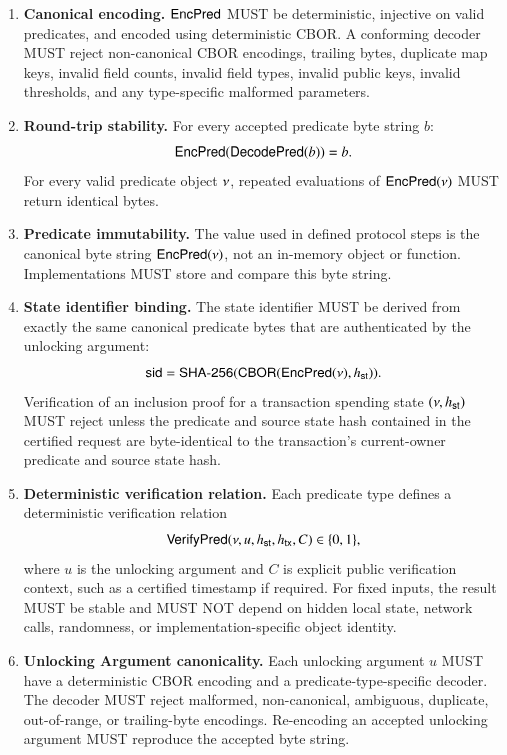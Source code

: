 \begin{enumerate}
  \item \textbf{Canonical encoding.}
    $\mathsf{EncPred}$ MUST be deterministic, injective on valid predicates, and encoded using deterministic CBOR. A conforming decoder MUST reject non-canonical CBOR encodings, trailing bytes, duplicate map keys, invalid field counts, invalid field types, invalid public keys, invalid thresholds, and any type-specific malformed parameters.

  \item \textbf{Round-trip stability.}
    For every accepted predicate byte string $b$:
    \[
      \mathsf{EncPred}(\mathsf{DecodePred}(b)) = b.
    \]
    For every valid predicate object $\nu$, repeated evaluations of $\mathsf{EncPred}(\nu)$ MUST return identical bytes.

  \item \textbf{Predicate immutability.}
    The value used in defined protocol steps is the canonical byte string $\mathsf{EncPred}(\nu)$, not an in-memory object or function. Implementations MUST store and compare this byte string.

    \item \textbf{State identifier binding.}
    The state identifier MUST be derived from exactly the same canonical predicate bytes that are authenticated by the unlocking argument:
    \[
      \mathsf{sid} =
      \mathsf{SHA\text{-}256}(
        \mathsf{CBOR}(\mathsf{EncPred}(\nu), {h_\mathsf{st}})
      ).
    \]
    Verification of an inclusion proof for a transaction spending state $(\nu,{h_\mathsf{st}})$ MUST reject unless the predicate and source state
  hash contained in the certified request are byte-identical to the transaction's current-owner predicate and source state hash.

    \item \textbf{Deterministic verification relation.}
    Each predicate type defines a deterministic verification relation
    \[
      \mathsf{VerifyPred}(\nu, u, {h_\mathsf{st}}, {h_\mathsf{tx}}, C) \in \{0,1\},
    \]
    where $u$ is the unlocking argument and $C$ is explicit public verification context, such as a certified timestamp if required. For fixed inputs, the result MUST be stable and MUST NOT depend on hidden local state, network calls, randomness, or implementation-specific
  object identity.



    \item \textbf{Unlocking Argument canonicality.}
    Each unlocking argument $u$ MUST have a deterministic CBOR encoding and a predicate-type-specific decoder. The decoder MUST reject malformed, non-canonical, ambiguous, duplicate, out-of-range, or trailing-byte encodings. Re-encoding an accepted unlocking argument MUST reproduce the accepted byte string.


\end{enumerate}
